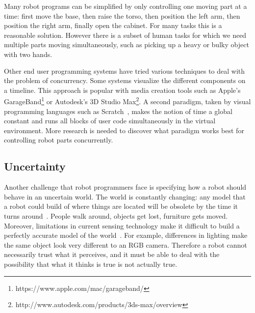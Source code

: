 \documentclass[10pt,twocolumn]{article}
\begin{document}
Many robot programs can be simplified by only controlling one moving part at a time: first move the base, then raise the torso, then position the left arm, then position the right arm, finally open the cabinet. For many tasks this is a reasonable solution. However there is a subset of human tasks for which we need multiple parts moving simultaneously, such as picking up a heavy or bulky object with two hands.

Other end user programming systems have tried various techniques to deal with the problem of concurrency. Some systems visualize the different components on a timeline. This approach is popular with media creation tools such as Apple's GarageBand\footnote{https://www.apple.com/mac/garageband/} or Autodesk's 3D Studio Max\footnote{http://www.autodesk.com/products/3ds-max/overview}. A second paradigm, taken by visual programming languages such as Scratch~\cite{scratch}, makes the notion of time a global constant and runs all blocks of user code simultaneously in the virtual environment. More research is needed to discover what paradigm works best for controlling robot parts concurrently.


\subsection{Uncertainty}


Another challenge that robot programmers face is specifying how a robot should behave in an uncertain world. The world is constantly changing: any model that a robot could build of where things are located will be obsolete by the time it turns around~\cite{fox-jair99}. People walk around, objects get lost, furniture gets moved. Moreover, limitations in current sensing technology make it difficult to build a perfectly accurate model of the world~\cite{kemp-ieee07}. For example, differences in lighting make the same object look very different to an RGB camera. Therefore a robot cannot necessarily trust what it perceives, and it must be able to deal with the possibility that what it thinks is true is not actually true.
\end{document}
